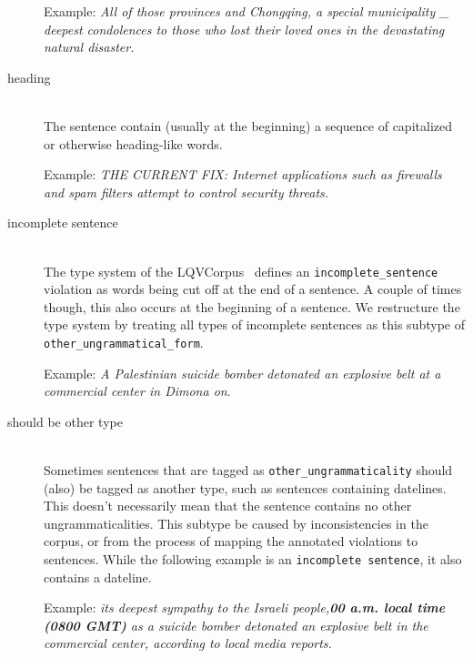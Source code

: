 \documentclass[a4paper,10pt]{scrartcl}
\theoremstyle{style}
\begin{document}
\begin{description}
	Example: \textit{All of those provinces and Chongqing, a special municipality \_ deepest condolences to those who lost their loved ones in the devastating natural disaster.}

\item[heading] \hfill \\
	The sentence contain (usually at the beginning) a sequence of capitalized or otherwise heading-like words. %

	Example: \textit{THE CURRENT FIX: Internet applications such as firewalls and spam filters attempt to control security threats.}

\item[incomplete sentence] \hfill \\
	The type system of the LQVCorpus~\citep{valeeva} defines an \texttt{incomplete\_sentence} violation as words being cut off at the end of a sentence. A couple of times though, this also occurs at the beginning of a sentence. We restructure the type system by treating all types of incomplete sentences as this subtype of \texttt{other\_ungrammatical\_form}.

	Example: \textit{A Palestinian suicide bomber detonated an explosive belt at a \\commercial center in Dimona on}.
\item[should be other type] \hfill \\
	Sometimes sentences that are tagged as \texttt{other\_ungrammaticality} should (also) be tagged as another type, such as sentences containing datelines. This doesn't necessarily mean that the sentence contains no other ungrammaticalities. This subtype be caused by inconsistencies in the corpus, or from the process of mapping the annotated violations to sentences. While the following example is an \texttt{incomplete sentence}, it also contains a dateline.

	Example: \textit{its deepest sympathy to the Israeli people,\textbf{00 a.m. local time (0800 GMT)} as a suicide bomber detonated an explosive belt in the commercial center, according to local media reports.}
%


\end{description}
\end{document}
